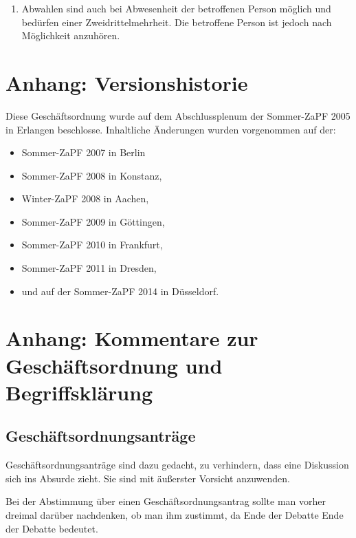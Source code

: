 \documentclass[draft,12pt,oneside]{scrreprt}
\begin{document}
\begin{enumerate}
\item Abwahlen sind auch bei Abwesenheit der betroffenen Person möglich und
      bedürfen einer Zweidrittelmehrheit.
      Die betroffene Person ist jedoch nach Möglichkeit anzuhören.
\end{enumerate}

\section*{Anhang: Versionshistorie}

Diese Geschäftsordnung wurde auf dem Abschlussplenum der Sommer-ZaPF 2005 in
Erlangen beschlosse.
Inhaltliche Änderungen wurden vorgenommen auf der:

\begin{itemize}

\item Sommer-ZaPF 2007 in Berlin

\item Sommer-ZaPF 2008 in Konstanz,

\item Winter-ZaPF 2008 in Aachen,

\item Sommer-ZaPF 2009 in Göttingen,

\item Sommer-ZaPF 2010 in Frankfurt,

\item Sommer-ZaPF 2011 in Dresden,

\item und auf der Sommer-ZaPF 2014 in Düsseldorf.

\end{itemize}

\section*{Anhang: Kommentare zur Geschäftsordnung und Begriffsklärung}

\subsection*{Geschäftsordnungsanträge}

Geschäftsordnungsanträge sind dazu gedacht, zu verhindern, dass eine Diskussion
sich ins Absurde zieht. Sie sind mit äußerster Vorsicht anzuwenden.

Bei der Abstimmung über einen Geschäftsordnungsantrag sollte man vorher dreimal
darüber nachdenken, ob man ihm zustimmt, da Ende der Debatte Ende der Debatte
bedeutet.
\end{document}
